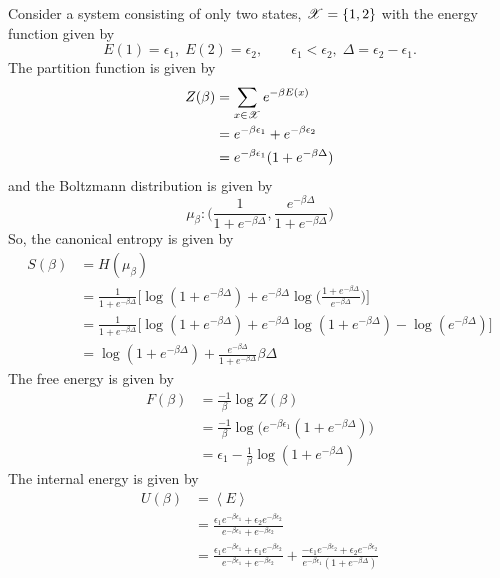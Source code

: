 \documentclass[letterpaper,english,10pt]{article}
\begin{document}
\begin{exmp}
Consider a system consisting of only two states, $\mathscr{X} = \{ 1, 2 \}$ with the energy function given by
$$ E(1) = \epsilon_1,\; E(2) = \epsilon_2, \qquad \epsilon_1 < \epsilon_2,\; \Delta = \epsilon_2 - \epsilon_1.$$
The partition function is given by
\begin{align}
Z(\beta) &= \sum_{x \in \mathscr{X}} e^{-\beta E(x)} \nonumber \\
	&= e^{-\beta \epsilon_1} + e^{-\beta \epsilon_2} \nonumber \\
	&= e^{-\beta \epsilon_1}(1 + e^{-\beta \Delta})
\end{align}
and the Boltzmann distribution is given by
$$\mu_\beta : \Big( \frac{1}{1 + e^{-\beta \Delta}}, \frac{e^{-\beta \Delta}}{1 + e^{-\beta \Delta}} \Big)$$
So, the canonical entropy is given by
\begin{align}
S(\beta) &= H(\mu_\beta) \nonumber \\
	&= \frac{1}{1 + e^{-\beta \Delta}} \Bigg[ \log(1 + e^{-\beta \Delta}) + e^{-\beta \Delta} \log\bigg(\frac{1 + e^{-\beta \Delta}}{e^{-\beta \Delta}}\bigg)\Bigg] \nonumber \\
	&= \frac{1}{1 + e^{-\beta \Delta}} \Bigg[ \log(1 + e^{-\beta \Delta}) + e^{-\beta \Delta} \log(1 + e^{-\beta \Delta}) - \log (e^{-\beta \Delta})\Bigg] \nonumber \\
	&= \log(1 + e^{-\beta \Delta}) + \frac{e^{-\beta \Delta}}{1 + e^{-\beta \Delta}} \beta \Delta
\end{align}
The free energy is given by
\begin{align}
F(\beta) &= \frac{-1}{\beta} \log Z(\beta) \nonumber \\
	&= \frac{-1}{\beta} \log \bigg( e^{-\beta \epsilon_1}(1 + e^{-\beta \Delta})\bigg) \nonumber \\
	&= \epsilon_1 - \frac{1}{\beta} \log(1 + e^{-\beta \Delta})
\end{align}
The internal energy is given by
\begin{align}
U(\beta) &= \left\langle E \right\rangle \nonumber \\
	&= \frac{\epsilon_1 e^{-\beta \epsilon_1} + \epsilon_2 e^{-\beta \epsilon_2}}{e^{-\beta \epsilon_1} + e^{-\beta \epsilon_2}} \nonumber \\
	&= \frac{\epsilon_1 e^{-\beta \epsilon_1} + \epsilon_1 e^{-\beta \epsilon_2}}{e^{-\beta \epsilon_1} + e^{-\beta \epsilon_2}} + \frac{-\epsilon_1 e^{-\beta \epsilon_2} + \epsilon_2 e^{-\beta \epsilon_2}}{e^{-\beta \epsilon_1}(1 + e^{-\beta \Delta})} \nonumber \\

\end{align}
\end{exmp}
\end{document}
